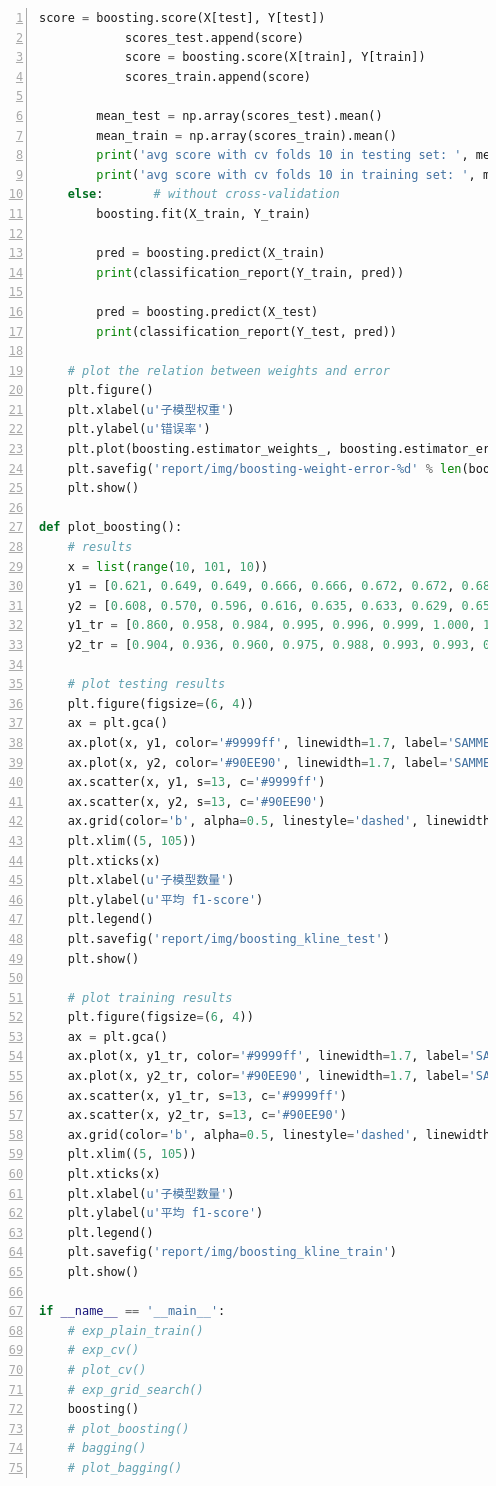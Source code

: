 \documentclass[12pt,a4paper]{article}
\theoremstyle{definition}
\begin{document}
\begin{appendix}
\begin{lstlisting}[language=Python,
	numbers=left,
	keywordstyle=\color{blue!70},
	frame=shadowbox,
	breaklines=True]
            score = boosting.score(X[test], Y[test])
            scores_test.append(score)
            score = boosting.score(X[train], Y[train])
            scores_train.append(score)

        mean_test = np.array(scores_test).mean()
        mean_train = np.array(scores_train).mean()
        print('avg score with cv folds 10 in testing set: ', mean_test)
        print('avg score with cv folds 10 in training set: ', mean_train)
    else:       # without cross-validation
        boosting.fit(X_train, Y_train)

        pred = boosting.predict(X_train)
        print(classification_report(Y_train, pred))

        pred = boosting.predict(X_test)
        print(classification_report(Y_test, pred))

    # plot the relation between weights and error
    plt.figure()
    plt.xlabel(u'子模型权重')
    plt.ylabel(u'错误率')
    plt.plot(boosting.estimator_weights_, boosting.estimator_errors_)
    plt.savefig('report/img/boosting-weight-error-%d' % len(boosting.estimator_weights_))
    plt.show()

def plot_boosting():
    # results
    x = list(range(10, 101, 10))
    y1 = [0.621, 0.649, 0.649, 0.666, 0.666, 0.672, 0.672, 0.688, 0.688, 0.710]
    y2 = [0.608, 0.570, 0.596, 0.616, 0.635, 0.633, 0.629, 0.650, 0.664, 0.668]
    y1_tr = [0.860, 0.958, 0.984, 0.995, 0.996, 0.999, 1.000, 1.000, 1.000, 1.000]
    y2_tr = [0.904, 0.936, 0.960, 0.975, 0.988, 0.993, 0.993, 0.995, 0.997, 0.998]

    # plot testing results
    plt.figure(figsize=(6, 4))
    ax = plt.gca()
    ax.plot(x, y1, color='#9999ff', linewidth=1.7, label='SAMME.R')
    ax.plot(x, y2, color='#90EE90', linewidth=1.7, label='SAMME')
    ax.scatter(x, y1, s=13, c='#9999ff')
    ax.scatter(x, y2, s=13, c='#90EE90')
    ax.grid(color='b', alpha=0.5, linestyle='dashed', linewidth=0.5)
    plt.xlim((5, 105))
    plt.xticks(x)
    plt.xlabel(u'子模型数量')
    plt.ylabel(u'平均 f1-score')
    plt.legend()
    plt.savefig('report/img/boosting_kline_test')
    plt.show()

    # plot training results
    plt.figure(figsize=(6, 4))
    ax = plt.gca()
    ax.plot(x, y1_tr, color='#9999ff', linewidth=1.7, label='SAMME.R')
    ax.plot(x, y2_tr, color='#90EE90', linewidth=1.7, label='SAMME')
    ax.scatter(x, y1_tr, s=13, c='#9999ff')
    ax.scatter(x, y2_tr, s=13, c='#90EE90')
    ax.grid(color='b', alpha=0.5, linestyle='dashed', linewidth=0.5)
    plt.xlim((5, 105))
    plt.xticks(x)
    plt.xlabel(u'子模型数量')
    plt.ylabel(u'平均 f1-score')
    plt.legend()
    plt.savefig('report/img/boosting_kline_train')
    plt.show()

if __name__ == '__main__':
    # exp_plain_train()
    # exp_cv()
    # plot_cv()
    # exp_grid_search()
    boosting()
    # plot_boosting()
    # bagging()
    # plot_bagging()
	\end{lstlisting}
	
\end{appendix}

\end{document}
